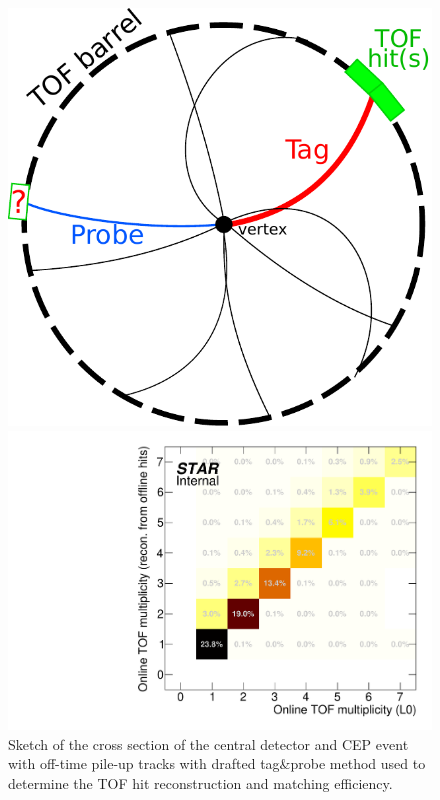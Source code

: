\begin{figure}[b!]%
\centering%
\begin{minipage}{.4725\textwidth}%
  \centering%
  \includegraphics[width=0.98\linewidth]{graphics/systematicsEfficiency/TOF_tagAndProbe/sketch.pdf}%
  \caption[Sketch of the tag\&probe method.]%
  {Sketch of the cross section of the central detector and CEP event with off-time pile-up tracks with drafted tag\&probe method used to determine the TOF hit reconstruction and matching efficiency.\newline }\label{fig:tagAndProbeSketch}
\end{minipage}%
\quad\quad%
\begin{minipage}{.4725\textwidth}%
  \centering%
  \includegraphics[width=\linewidth]{graphics/systematicsEfficiency/TOF_tagAndProbe/TofMultOfflineVsOnline.pdf}%

\end{minipage}
\end{figure}
